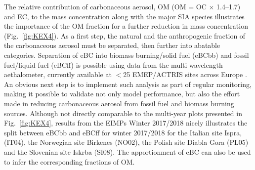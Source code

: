 The relative contribution of carbonaceous aerosol, OM (OM = OC $\times$
1.4--1.7)
 and EC, to the \pmfine mass concentration along with the major
SIA species illustrates the importance of the OM fraction for a further
reduction in \pmfine mass concentration (Fig.~\ref{fig:KEX4}). As a first step,
the natural and the anthropogenic fraction of the carbonaceous aerosol
must be separated, then further into abatable categories. Separation of
eBC into biomass burning/solid fuel (eBCbb) and fossil fuel/liquid fuel
(eBCff) is possible using data from the multi wavelength aethalometer,
currently available at $<$25 EMEP/ACTRIS sites across Europe \citep{Platt20XX}
. An obvious next
step is to implement such analysis as part of regular monitoring,
making it possible to validate not only model performance, but also the
effort made in reducing carbonaceous aerosol from fossil fuel and biomass
burning sources. Although not directly comparable to the multi-year plots
presented in Fig.~\ref{fig:KEX4}, results from the EIMPs Winter 2017/2018 nicely
illustrates the split between eBCbb and eBCff for winter 2017/2018 for
the Italian site Ispra, (IT04), the Norwegian site Birkenes (NO02), the
Polish site Diabla Gora (PL05) and the Slovenian site Iskrba (SI08). The
apportionment of eBC can also be used to infer the corresponding fractions
of OM.

